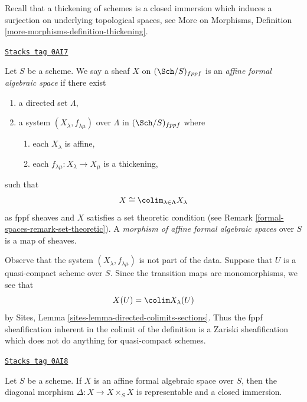 \medskip\noindent
Recall that a thickening of schemes is a closed
immersion which induces a surjection on underlying topological
spaces, see More on Morphisms, Definition
\ref{more-morphisms-definition-thickening}.

\begin{definition}
\label{formal-spaces-definition-affine-formal-algebraic-space}
\href{https://stacks.math.columbia.edu/tag/0AI7}{\texttt{Stacks tag 0AI7}}

Let $S$ be a scheme. We say a sheaf $X$ on $(\Sch/S)_{fppf}$ is an
{\it affine formal algebraic space} if there exist
\begin{enumerate}
\item a directed set $\Lambda$,
\item a system $(X_\lambda, f_{\lambda \mu})$ over $\Lambda$
in $(\Sch/S)_{fppf}$ where
\begin{enumerate}
\item each $X_\lambda$ is affine,
\item each $f_{\lambda \mu} : X_\lambda \to X_\mu$ is a thickening,
\end{enumerate}
\end{enumerate}
such that
$$
X \cong \colim_{\lambda \in \Lambda} X_\lambda
$$
as fppf sheaves and $X$ satisfies a set theoretic condition
(see Remark \ref{formal-spaces-remark-set-theoretic}). A
{\it morphism of affine formal algebraic spaces}
over $S$ is a map of sheaves.
\end{definition}

Observe that the system $(X_\lambda, f_{\lambda \mu})$ is not
part of the data. Suppose that $U$ is a quasi-compact scheme over $S$.
Since the transition maps are monomorphisms, we see that
$$
X(U) = \colim X_\lambda(U)
$$
by Sites, Lemma \ref{sites-lemma-directed-colimits-sections}.
Thus the fppf sheafification inherent in the colimit of the
definition is a Zariski sheafification which does not do
anything for quasi-compact schemes.

\begin{lemma}
\label{formal-spaces-lemma-diagonal-affine-formal-algebraic-space}
\href{https://stacks.math.columbia.edu/tag/0AI8}{\texttt{Stacks tag 0AI8}}

Let $S$ be a scheme. If $X$ is an affine formal algebraic space over
$S$, then the diagonal morphism $\Delta : X \to X \times_S X$
is representable and a closed immersion.
\end{lemma}


